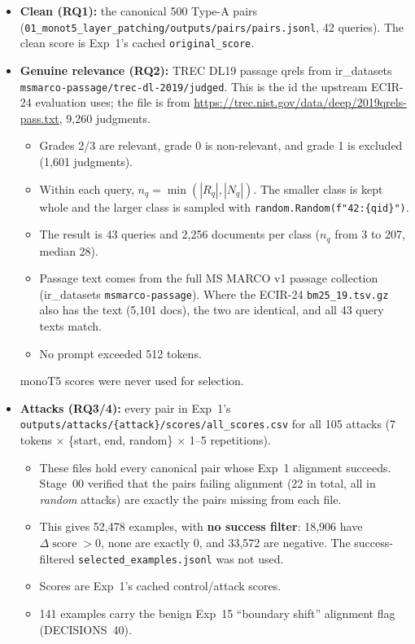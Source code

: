 \documentclass[11pt]{article}
\newcommand{\score}{\operatorname{score}}
\begin{document}
\begin{itemize}[leftmargin=*]
  \item \textbf{Clean (RQ1):} the canonical 500 Type-A pairs
        (\texttt{01\_monot5\_layer\_patching/outputs/pairs/pairs.jsonl}, 42 queries).
        The clean score is Exp~1's cached \texttt{original\_score}.
  \item \textbf{Genuine relevance (RQ2):} TREC DL19 passage qrels from ir\_datasets
        \texttt{msmarco-passage/trec-dl-2019/judged}. This is the id the upstream
        ECIR-24 evaluation uses; the file is from
        \url{https://trec.nist.gov/data/deep/2019qrels-pass.txt}, 9,260 judgments.
        \begin{itemize}[nosep]
          \item Grades 2/3 are relevant, grade 0 is non-relevant, and grade 1 is
                excluded (1,601 judgments).
          \item Within each query, $n_q=\min(|R_q|,|N_q|)$. The smaller class is kept
                whole and the larger class is sampled with
                \texttt{random.Random(f"42:\{qid\}")}.
          \item The result is 43 queries and 2,256 documents per class ($n_q$ from 3 to
                207, median 28).
          \item Passage text comes from the full MS MARCO v1 passage collection
                (ir\_datasets \texttt{msmarco-passage}). Where the ECIR-24
                \texttt{bm25\_19.tsv.gz} also has the text (5,101 docs), the two are
                identical, and all 43 query texts match.
          \item No prompt exceeded 512 tokens.
        \end{itemize}
        monoT5 scores were never used for selection.
  \item \textbf{Attacks (RQ3/4):} every pair in Exp~1's
        \texttt{outputs/attacks/\{attack\}/scores/all\_scores.csv} for all 105 attacks
        (7 tokens $\times$ \{start, end, random\} $\times$ 1--5 repetitions).
        \begin{itemize}[nosep]
          \item These files hold every canonical pair whose Exp~1 alignment succeeds.
                Stage~00 verified that the pairs failing alignment (22 in total, all in
                \emph{random} attacks) are exactly the pairs missing from each file.
          \item This gives 52,478 examples, with \textbf{no success filter}:
                18,906 have $\Delta\score>0$, none are exactly 0, and 33,572 are
                negative. The success-filtered \texttt{selected\_examples.jsonl} was
                not used.
          \item Scores are Exp~1's cached control/attack scores.
          \item 141 examples carry the benign Exp~15 ``boundary shift'' alignment flag
                (DECISIONS~40).
        \end{itemize}
\end{itemize}
\end{document}
